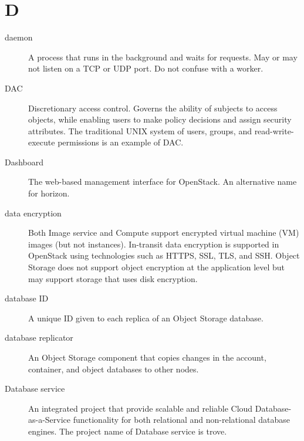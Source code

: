 \documentclass[letterpaper,10pt,english]{sphinxmanual}
\begin{document}
\section{D}
\label{_source/glossary:d}\begin{description}
\item[{daemon}] \leavevmode{}\label{_source/glossary:term-daemon}
A process that runs in the background and waits for requests.
May or may not listen on a TCP or UDP port. Do not confuse with a
worker.

\item[{DAC}] \leavevmode{}\label{_source/glossary:term-dac}
Discretionary access control. Governs the ability of subjects to
access objects, while enabling users to make policy decisions and
assign security attributes. The traditional UNIX system of users,
groups, and read-write-execute permissions is an example of
DAC.

\item[{Dashboard}] \leavevmode{}\label{_source/glossary:term-dashboard}
The web-based management interface for OpenStack. An alternative
name for horizon.

\item[{data encryption}] \leavevmode{}\label{_source/glossary:term-data-encryption}
Both Image service and Compute support encrypted virtual machine
(VM) images (but not instances). In-transit data encryption is
supported in OpenStack using technologies such as HTTPS, SSL, TLS, and
SSH. Object Storage does not support object encryption at the
application level but may support storage that uses disk encryption.

\item[{database ID}] \leavevmode{}\label{_source/glossary:term-database-id}
A unique ID given to each replica of an Object Storage
database.

\item[{database replicator}] \leavevmode{}\label{_source/glossary:term-database-replicator}
An Object Storage component that copies changes in the account,
container, and object databases to other nodes.

\item[{Database service}] \leavevmode{}\label{_source/glossary:term-database-service}
An integrated project that provide scalable and reliable
Cloud Database-as-a-Service functionality for both
relational and non-relational database engines. The project
name of Database service is trove.


\end{description}
\end{document}
